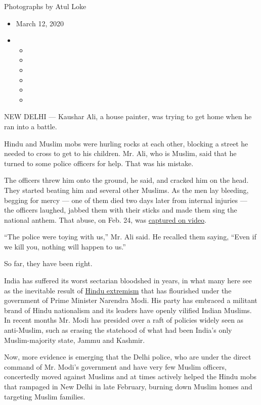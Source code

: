 Photographs by Atul Loke

\begin{itemize}
\item
  March 12, 2020
\item
  \begin{itemize}
  \item
  \item
  \item
  \item
  \item
  \item
  \end{itemize}
\end{itemize}

NEW DELHI --- Kaushar Ali, a house painter, was trying to get home when
he ran into a battle.

Hindu and Muslim mobs were hurling rocks at each other, blocking a
street he needed to cross to get to his children. Mr. Ali, who is
Muslim, said that he turned to some police officers for help. That was
his mistake.

The officers threw him onto the ground, he said, and cracked him on the
head. They started beating him and several other Muslims. As the men lay
bleeding, begging for mercy --- one of them died two days later from
internal injuries --- the officers laughed, jabbed them with their
sticks and made them sing the national anthem. That abuse, on Feb. 24,
was
\href{https://www.altnews.in/video-verification-delhi-cops-beating-injured-men-forcing-them-to-sing-national-anthem/}{captured
on video}.

``The police were toying with us,'' Mr. Ali said. He recalled them
saying, ``Even if we kill you, nothing will happen to us.''

So far, they have been right.

India has suffered its worst sectarian bloodshed in years, in what many
here see as the inevitable result of
\href{https://www.nytimes.com/2020/03/01/world/asia/india-modi-hindus.html}{Hindu
extremism} that has flourished under the government of Prime Minister
Narendra Modi. His party has embraced a militant brand of Hindu
nationalism and its leaders have openly vilified Indian Muslims. In
recent months Mr. Modi has presided over a raft of policies widely seen
as anti-Muslim, such as erasing the statehood of what had been India's
only Muslim-majority state, Jammu and Kashmir.

Now, more evidence is emerging that the Delhi police, who are under the
direct command of Mr. Modi's government and have very few Muslim
officers, concertedly moved against Muslims and at times actively helped
the Hindu mobs that rampaged in New Delhi in late February, burning down
Muslim homes and targeting Muslim families.

